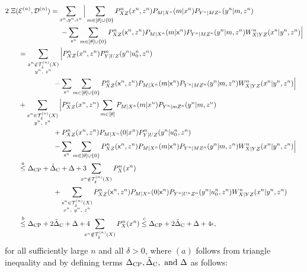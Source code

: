\begin{align*}
    2 \ \Xi(&\encodern,\decodern) =\sum_{\xn, \yn, \zn} \Big| \sum_{m \in [\theta] \cup \set{0}} P_{XZ}^n(\xn,\zn) P_{M|\Xn}(m|\xn)P_{\Yn|M\Zn}(\yn|m,\zn) \\
    & \hspace{60pt}-\sum_{\sfxn}\sum_{\substack{m \in [\theta] \cup \set{0} }}  P^n_{XZ}(\sfxn,\zn)P_{M|\Xn}(m|\sfxn) P_{\Yn|M\Zn}(\yn|m,\zn) W^n_{X|YZ}(\xn
    |\yn,\zn)\Big| \nonumber \\
    &=\sum_{\substack{\xn \notin \Tx \\ \yn,\ \zn}}
    \Big|P_{XZ}^n(\xn,\zn) P^n_{Y|UZ}(\yn|u_0^n,\zn) \\
    & \hspace{50pt}
    - \sum_{\sfxn}\sum_{\substack{m \in [\theta] \cup \set{0} }}   P^n_{XZ}(\sfxn,\zn)P_{M|\Xn}(m|\sfxn) P_{\Yn|M\Zn}(\yn|m,\zn) W^n_{X|YZ}(\xn
    |\yn,\zn)\Big|\\
     &+\sum_{\substack{\xn \in \Tx \\ \yn,\ \zn}}
    \Big|P_{XZ}^n(\xn,\zn) \sum_{m\in [\theta]}P_{M|\Xn}(m|\xn) P_{\Yn|m\Zn}(\yn|m,\zn) \\
    & \hspace{50pt}
    + P_{XZ}^n(\xn,\zn)P_{M|\Xn}(0|\xn)P^n_{Y|UZ}(\yn|u_0^n,\zn)\\
    & \hspace{50pt}
    - \sum_{\sfxn}\sum_{\substack{m \in [\theta] \cup \set{0}}}  P^n_{XZ}(\sfxn,\zn)P_{M|\Xn}(m|\sfxn) P_{\Yn|M\Zn}(\yn|m,\zn) W^n_{X|YZ}(\xn
    |\yn,\zn)
    \Big|\\
    & \overset{a}{\leq} \cpe + \notce +  \er + 3 \!\!\!\!\!\!\sum_{\xn \notin \Tx}P^n_X{(\xn)} \\
    & \hspace{50pt} + \sum_{\substack{\sfxn \in \Tx \\ \xn,\ \yn,\ \zn}} P^n_{XZ}(\sfxn,\zn)P_{M|\Xn}(0|\sfxn) P_{\Yn|\Un\Zn}(\yn|u_0^n,\zn) W^n_{X|YZ}(\xn
    |\yn,\zn)\\
    & \overset{b}{\leq} \cpe + 2\notce  + \er + 4 \!\!\!\!\!\!\sum_{\xn \notin \Tx}P^n_X{(\xn)} 
    \overset{c}{\leq}\cpe + 2\notce + \er +  4\epsilon,
\end{align*}
for all sufficiently large $n$ and all $\delta>0$, where $(a)$ follows from triangle inequality and by defining terms $\Delta_{\text{CP}} ,\Tilde{\Delta}_{\text{C}},\text{ and } {\Delta}$ as follows:
